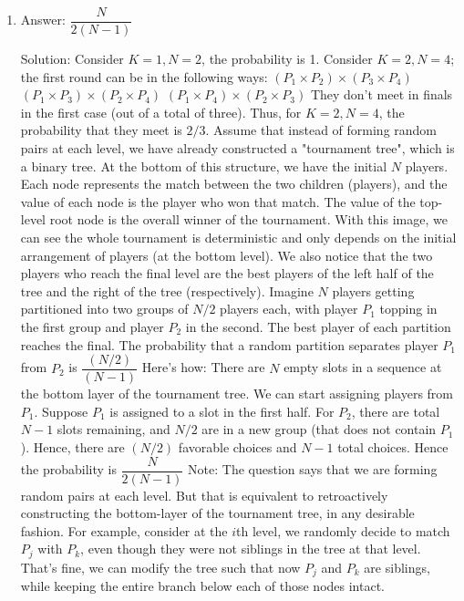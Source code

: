 \begin{enumerate}
\item
Answer: $\dfrac{N}{2(N-1)}$
 
Solution: Consider $K=1, N=2$, the probability is 1.
Consider $K=2, N=4$; the first round can be in the following ways:
$(P_1 \times P_2 ) \times ( P_3 \times P_4 )$
$(P_1 \times P_3 ) \times ( P_2 \times P_4 )$
$(P_1 \times P_4 ) \times ( P_2 \times P_3 )$
They don't meet in finals in the first case (out of a total of three). Thus, for $K=2, N=4$, the probability that they meet is $2/3$.
Assume that instead of forming random pairs at each level, we have already constructed a "tournament tree", which is a binary tree. At the bottom of this structure, we have the initial $N$ players. Each node represents the match between the two children (players), and the value of each node is the player who won that match. The value of the top-level root node is the overall winner of the tournament.
With this image, we can see the whole tournament is deterministic and only depends on the initial arrangement of players (at the bottom level).
We also notice that the two players who reach the final level are the best players of the left half of the tree and the right of the tree (respectively).
Imagine $N$ players getting partitioned into two groups of $N/2$ players each, with player $P_1$ topping in the first group and player $P_2$ in the second. The best player of each partition reaches the final. The probability that a random partition separates player $P_1$ from $P_2$ is $\dfrac{(N/2)}{(N-1)}$
Here's how: There are $N$ empty slots in a sequence at the bottom layer of the tournament tree.
We can start assigning players from $P_1$.
Suppose $P_1$ is assigned to a slot in the first half. For $P_2$, there are total $N-1$ slots remaining, and $N/2$ are in a new group (that does not contain $P_1$). Hence, there are $(N/2)$ favorable choices and $N-1$ total choices.
Hence the probability is $\dfrac{N}{2(N-1)}$
Note: The question says that we are forming random pairs at each level. But that is equivalent to retroactively constructing the bottom-layer of the tournament tree, in any desirable fashion.
For example, consider at the $i$th level, we randomly decide to match $P_j$ with $P_k$, even though they were not siblings in the tree at that level.
That's fine, we can modify the tree such that now $P_j$ and $P_k$ are siblings, while keeping the entire branch below each of those nodes intact.





\end{enumerate}
